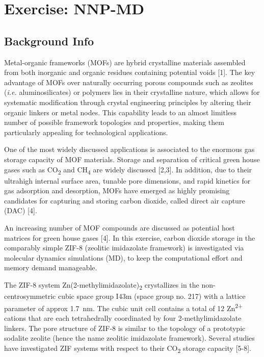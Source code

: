 \documentclass[
  letterpaper,
  DIV=11,
  numbers=noendperiod]{scrreprt}
\begin{document}
\part{Exercise: NNP-MD}

\hypertarget{background-info}{%
\chapter{Background Info}\label{background-info}}

Metal-organic frameworks (MOFs) are hybrid crystalline materials
assembled from both inorganic and organic residues containing potential
voids {[}1{]}. The key advantage of MOFs over naturally occurring porous
compounds such as zeolites (\emph{i.e.} aluminosilicates) or polymers
lies in their crystalline nature, which allows for systematic
modification through crystal engineering principles by altering their
organic linkers or metal nodes. This capability leads to an almost
limitless number of possible framework topologies and properties, making
them particularly appealing for technological applications.

One of the most widely discussed applications is associated to the
enormous gas storage capacity of MOF materials. Storage and separation
of critical green house gases such as CO\textsubscript{2} and
CH\textsubscript{4} are widely discussed {[}2,3{]}. In addition, due to
their ultrahigh internal surface area, tunable pore dimensions, and
rapid kinetics for gas adsorption and desorption, MOFs have emerged as
highly promising candidates for capturing and storing carbon dioxide,
called direct air capture (DAC) {[}4{]}.

An increasing number of MOF compounds are discussed as potential host
matrices for green house gases {[}4{]}. In this exercise, carbon dioxide
storage in the comparably simple ZIF-8 (zeolitic imidazolate framework)
is investigated via molecular dynamics simulations (MD), to keep the
computational effort and memory demand manageable.

The ZIF-8 system Zn(2-methylimidazolate)\textsubscript{2} crystallizes
in the non-centrosymmetric cubic space group I43m (space group no. 217)
with a lattice parameter of approx 1.7~nm. The cubic unit cell contains
a total of 12 Zn\textsuperscript{2+} cations that are each tetrahedrally
coordinated by four 2-methylimidazolate linkers. The pore structure of
ZIF-8 is similar to the topology of a prototypic sodalite zeolite (hence
the name zeolitic imidazolate framework). Several studies have
investigated ZIF systems with respect to their CO\textsubscript{2}
storage capacity {[}5-8{]}.
\end{document}
